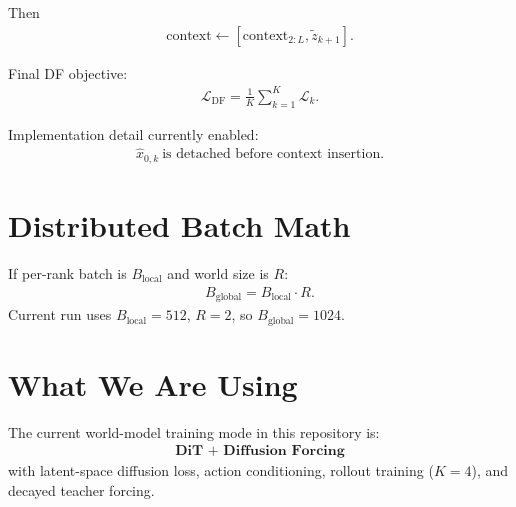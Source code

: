 \documentclass[11pt]{article}
\begin{document}
Then
\begin{align}
\text{context} \leftarrow [\text{context}_{2:L}, \tilde{z}_{k+1}].
\end{align}

Final DF objective:
\begin{align}
\mathcal{L}_{\text{DF}}=\frac{1}{K}\sum_{k=1}^{K}\mathcal{L}_k.
\end{align}

Implementation detail currently enabled:
\begin{align}
\hat{x}_{0,k}\ \text{is detached before context insertion.}
\end{align}

\section{Distributed Batch Math}
If per-rank batch is $B_{\text{local}}$ and world size is $R$:
\begin{align}
B_{\text{global}} = B_{\text{local}} \cdot R.
\end{align}
Current run uses $B_{\text{local}}=512$, $R=2$, so $B_{\text{global}}=1024$.

\section{What We Are Using}
The current world-model training mode in this repository is:
\begin{align}
\textbf{DiT + Diffusion Forcing}
\end{align}
with latent-space diffusion loss, action conditioning, rollout training ($K=4$), and decayed teacher forcing.
\end{document}
